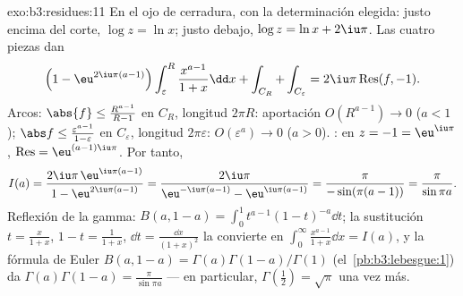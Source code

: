 \begin{solution}{exo:b3:residues:11}
En el ojo de cerradura, con la determinación elegida: justo encima del
corte, $\log z = \ln x$; justo debajo, $\log z =
\ln x + 2\iu\pi$. Las cuatro piezas dan
\[
\Bigl(1 - \eu^{2\iu\pi(a-1)}\Bigr)\int_\varepsilon^R
\frac{x^{a-1}}{1+x}\dd x + \int_{C_R} + \int_{C_\varepsilon}
= 2\iu\pi\operatorname{Res}(f, -1) .
\]
Arcos: $\abs{f} \leq \frac{R^{a-1}}{R - 1}$ en $C_R$, longitud $2\pi R$:
aportación $O(R^{a-1}) \to 0$ ($a < 1$);
$\abs f \leq \frac{\varepsilon^{a-1}}{1 - \varepsilon}$ en
$C_\varepsilon$, longitud $2\pi\varepsilon$: $O(\varepsilon^a)
\to 0$ ($a > 0$). : en
$z = -1 = \eu^{\iu\pi}$, $\operatorname{Res} = \eu^{(a-1)\iu\pi}$. Por
tanto,
\[
I(a) = \frac{2\iu\pi\,\eu^{\iu\pi(a-1)}}{1 -
\eu^{2\iu\pi(a-1)}}
= \frac{2\iu\pi}{\eu^{-\iu\pi(a-1)} - \eu^{\iu\pi(a-1)}}
= \frac{\pi}{-\sin(\pi(a-1))} = \frac{\pi}{\sin\pi a} .
\]
Reflexión de la gamma: $B(a, 1-a) =
\int_0^1t^{a-1}(1-t)^{-a}\dd t$; la sustitución $t =
\frac x{1+x}$, $1 - t = \frac1{1+x}$, $\dd t =
\frac{\dd x}{(1+x)^2}$ la convierte en $\int_0^\infty
\frac{x^{a-1}}{1+x}\dd x = I(a)$, y la fórmula de Euler
$B(a, 1-a) = \Gamma(a)\Gamma(1-a)/\Gamma(1) $
(el~\cref{pb:b3:lebesgue:1}) da
$\Gamma(a)\Gamma(1-a) = \frac\pi{\sin\pi a}$ --- en particular,
$\Gamma(\tfrac12) = \sqrt\pi$ una vez más.

\end{solution}

